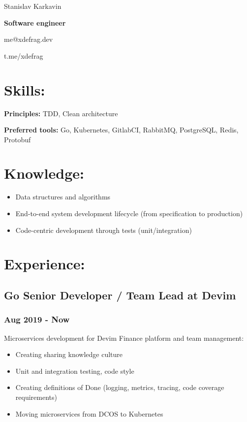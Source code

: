 \documentclass[letterpaper]{article}
\date{\today}
\title{}
\begin{document}
\begin{center}
Stanislav Karkavin

\textbf{\textbf{Software engineer}}

me@xdefrag.dev

t.me/xdefrag
\end{center}

\section{Skills:}
\label{sec:orgd25c924}
\textbf{\textbf{Principles:}} TDD, Clean architecture

\textbf{\textbf{Preferred tools:}} Go, Kubernetes, GitlabCI, RabbitMQ, PostgreSQL, Redis, Protobuf

\section{Knowledge:}
\label{sec:orgacd92c7}
\begin{itemize}
\item Data structures and algorithms
\item End-to-end system development lifecycle (from specification to production)
\item Code-centric development through tests (unit/integration)
\end{itemize}

\section{Experience:}
\label{sec:org0ef5fdf}

\subsection{Go Senior Developer / Team Lead at Devim}
\label{sec:org46dc88a}
\subsubsection{Aug 2019 - Now}
\label{sec:orgab095e9}
Microservices development for Devim Finance platform and team management:
\begin{itemize}
\item Creating sharing knowledge culture
\item Unit and integration testing, code style
\item Creating definitions of Done (logging, metrics, tracing, code coverage requirements)
\item Moving microservices from DCOS to Kubernetes
\end{itemize}
\end{document}
